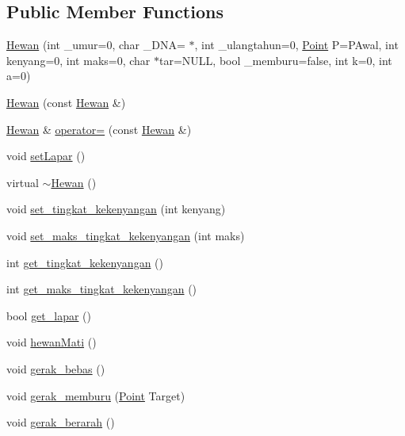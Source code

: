 \subsection*{Public Member Functions}
\begin{DoxyCompactItemize}
\item 
\hyperlink{class_hewan_a6b148b7d2380f746f2c7943d9adc4e15}{Hewan} (int \+\_\+umur=0, char \+\_\+\+D\+NA= \textquotesingle{}$\ast$\textquotesingle{}, int \+\_\+ulangtahun=0, \hyperlink{class_point}{Point} P=P\+Awal, int kenyang=0, int maks=0, char $\ast$tar=N\+U\+LL, bool \+\_\+memburu=false, int k=0, int a=0)
\item 
\hyperlink{class_hewan_a9a7e8b448780d0ebff93d06d82c77795}{Hewan} (const \hyperlink{class_hewan}{Hewan} \&)
\item 
\hyperlink{class_hewan}{Hewan} \& \hyperlink{class_hewan_ae6fca2e8de85c914a6ac040a9aea3d58}{operator=} (const \hyperlink{class_hewan}{Hewan} \&)
\item 
void \hyperlink{class_hewan_a488b6dde625a4b75f0014856ce5f7a47}{set\+Lapar} ()
\item 
virtual \hyperlink{class_hewan_aa3bee8976cb61cae94ee920fc371cf6c}{$\sim$\+Hewan} ()
\item 
void \hyperlink{class_hewan_a54587f410e4a417aa48baad66e3abeab}{set\+\_\+tingkat\+\_\+kekenyangan} (int kenyang)
\item 
void \hyperlink{class_hewan_aff60666bdcd276a6d5538905e8132a8e}{set\+\_\+maks\+\_\+tingkat\+\_\+kekenyangan} (int maks)
\item 
int \hyperlink{class_hewan_abf1d8353674e5f68018a68f17804ea96}{get\+\_\+tingkat\+\_\+kekenyangan} ()
\item 
int \hyperlink{class_hewan_ac8d2313e06af76164b7ce143489596f7}{get\+\_\+maks\+\_\+tingkat\+\_\+kekenyangan} ()
\item 
bool \hyperlink{class_hewan_a79068d1eb649c561b12a92a5de159601}{get\+\_\+lapar} ()
\item 
void \hyperlink{class_hewan_a2a5a54ebd082dbbd8b3ccee27c8233c1}{hewan\+Mati} ()
\item 
void \hyperlink{class_hewan_a9e143b9a009a9c6931c5186fd6a01733}{gerak\+\_\+bebas} ()
\item 
void \hyperlink{class_hewan_a60d1ecc64ab1715a53c6b925046ef389}{gerak\+\_\+memburu} (\hyperlink{class_point}{Point} Target)
\item 
void \hyperlink{class_hewan_aad665dcba615fccf92e06b295e47c50a}{gerak\+\_\+berarah} ()
\end{DoxyCompactItemize}


